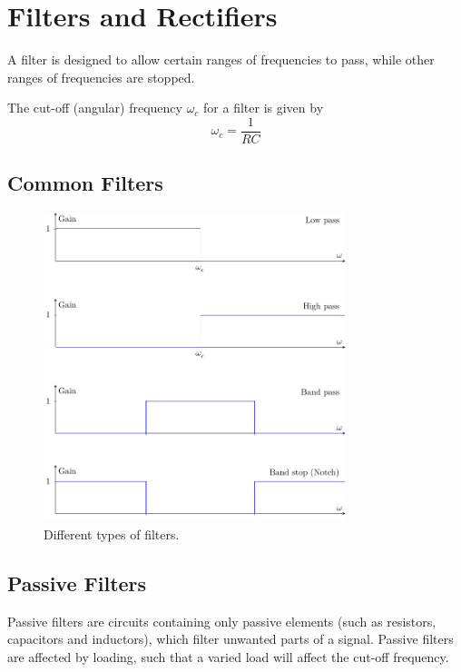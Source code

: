 \documentclass{article}
\begin{document}
\section{Filters and Rectifiers}
\begin{definition}[Filters]
    A filter is designed to allow certain ranges of frequencies to pass,
    while other ranges of frequencies are stopped.
\end{definition}
\begin{definition}
    The cut-off (angular) frequency \(\omega_c\) for a filter is given by
    \begin{equation*}
        \omega_c = \frac{1}{RC}
    \end{equation*}
\end{definition}
\subsection{Common Filters}
\begin{figure}[H]
    \centering
    \includegraphics[height = 9cm, keepaspectratio = true]{figures/filters.pdf}
    \caption{Different types of filters.}
\end{figure}
\subsection{Passive Filters}
Passive filters are circuits containing only passive elements (such as
resistors, capacitors and inductors), which filter unwanted parts of a
signal. Passive filters are affected by loading, such that a varied
load will affect the cut-off frequency.
\end{document}
